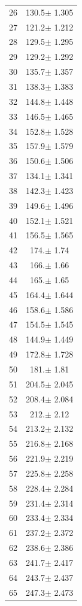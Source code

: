\documentclass[a4paper]{instrumentacao}
\begin{document}
\begin{longtable}{cc}
 26 & 130.5$\pm$ 1.305 \\
 27 & 121.2$\pm$ 1.212 \\
 28 & 129.5$\pm$ 1.295 \\
 29 & 129.2$\pm$ 1.292 \\
 30 & 135.7$\pm$ 1.357 \\
 31 & 138.3$\pm$ 1.383 \\
 32 & 144.8$\pm$ 1.448 \\
 33 & 146.5$\pm$ 1.465 \\
 34 & 152.8$\pm$ 1.528 \\
 35 & 157.9$\pm$ 1.579 \\
 36 & 150.6$\pm$ 1.506 \\
 37 & 134.1$\pm$ 1.341 \\
 38 & 142.3$\pm$ 1.423 \\
 39 & 149.6$\pm$ 1.496 \\
 40 & 152.1$\pm$ 1.521 \\
 41 & 156.5$\pm$ 1.565 \\
 42 & 174.$\pm$ 1.74 \\
 43 & 166.$\pm$ 1.66 \\
 44 & 165.$\pm$ 1.65 \\
 45 & 164.4$\pm$ 1.644 \\
 46 & 158.6$\pm$ 1.586 \\
 47 & 154.5$\pm$ 1.545 \\
 48 & 144.9$\pm$ 1.449 \\
 49 & 172.8$\pm$ 1.728 \\
 50 & 181.$\pm$ 1.81 \\
 51 & 204.5$\pm$ 2.045 \\
 52 & 208.4$\pm$ 2.084 \\
 53 & 212.$\pm$ 2.12 \\
 54 & 213.2$\pm$ 2.132 \\
 55 & 216.8$\pm$ 2.168 \\
 56 & 221.9$\pm$ 2.219 \\
 57 & 225.8$\pm$ 2.258 \\
 58 & 228.4$\pm$ 2.284 \\
 59 & 231.4$\pm$ 2.314 \\
 60 & 233.4$\pm$ 2.334 \\
 61 & 237.2$\pm$ 2.372 \\
 62 & 238.6$\pm$ 2.386 \\
 63 & 241.7$\pm$ 2.417 \\
 64 & 243.7$\pm$ 2.437 \\
 65 & 247.3$\pm$ 2.473 \\

\end{longtable}
\end{document}
